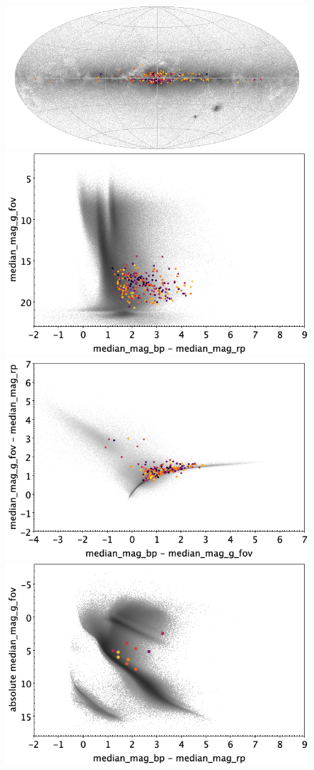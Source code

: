 \documentclass[longauth]{aa}
\begin{document}
\begin{appendix}
\begin{figure}
\centering
{}
\includegraphics[width=0.6\hsize]{figures/appendix/MICROLENSING_cls_sky.png} 
 \\ %
\vspace{4mm}
 \includegraphics[width=0.45\hsize]{figures/appendix/MICROLENSING_cls_cm.png}  %
\hspace{2mm}
 \includegraphics[width=0.45\hsize]{figures/appendix/MICROLENSING_cls_cc.png} \\ %
\vspace{4mm}
 \includegraphics[width=0.45\hsize]{figures/appendix/MICROLENSING_cls_cam.png}  %

\end{figure}
\end{appendix}
\end{document}
